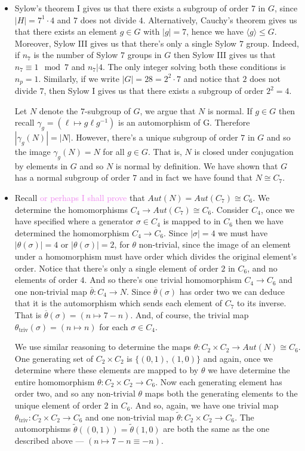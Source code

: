 \documentclass[12pt,letterpaper,boxed]{hmcpset}
\newcommand{\wg}[1]{\textcolor{violet}{#1}}
\newcommand{\abs}[1]{\left|#1\right|}
\newcommand{\inv}{^{-1}}
\begin{document}
\begin{solution}
\begin{itemize}
\item Sylow's theorem I gives us that there exists a subgroup of order
$7$ in $G$, since $\abs{H} = 7^1 \cdot 4$ and $7$ does not divide $4$. 
Alternatively, Cauchy's theorem gives us that there exists an element
$g \in G$ with $\abs{g} = 7$, hence we have $\langle g \rangle
\leq G$. Moreover, Sylow III gives us that there's only a single Sylow
$7$ group. Indeed, if $n_7$ is the number of Sylow $7$ groups in
$G$ then Sylow III gives us that $n_7 \equiv 1 \mod 7$ and $n_7 \vert
4$. The only integer solving both these conditions is $n_p = 1$. 
Similarly, if we write $\abs G = 28 = 2^2 \cdot 7$ and notice that $2$
does not divide $7$, then Sylow I gives us that there exists a subgroup of
order $2^2 = 4$.

Let $N$ denote the $7$-subgroup of $G$, we argue that $N$ is normal. 
If $g \in G$ then recall $\gamma_g =
(\ell \mapsto g\ell g\inv)$ is an automorphism of G. Therefore $\abs{\gamma_g(N)} =
\abs{N}$. However, there's a unique subgroup of order $7$ in $G$ and
so the image $\gamma_g(N) = N$ for all $g \in G$. That is, $N$ is
closed under conjugation by elements in $G$ and so $N$ is normal by
definition. We have shown that $G$ has a normal subgroup of order $7$
and in fact we have found that $N \cong C_7$.


\item Recall \wg{or perhaps I shall prove} that $Aut(N) = Aut(C_7)
\cong C_6$. We determine the homomorphisms $C_4 \to Aut(C_7) \cong
C_6$. 
Consider $C_4$, once we have specified where a generator
$\sigma \in C_4$ is mapped to in $C_6$ then we have determined the
homomorphism $C_4 \to C_6$.
Since $\abs \sigma = 4$ we must have $\abs{\theta(\sigma)} = 4$ or
$\abs{\theta(\sigma)} = 2$, for $\theta$ non-trivial,
since the image of an element under a homomorphism must have order
which divides the original element's order.
Notice that there's only a single element of order $2$ in $C_6$, and
no elements of order $4$. And
so there's one trivial homomorphism $C_4 \to C_6$ and one non-trivial map $\overline \theta: C_4
\to N$.
Since $\overline\theta(\sigma)$ has order two we can deduce that it is the
automorphism which sends each element of $C_7$ to its inverse. That is 
$\overline\theta(\sigma) = (n \mapsto 7 - n)$. And, of course, the
trivial map $\theta_{\text{triv}}(\sigma) = (n \mapsto n)$ for each
$\sigma \in C_4$. 

We use similar reasoning to determine the maps $\theta: C_2 \times C_2
\to Aut(N) \cong C_6$. One generating set of $C_2 \times C_2$ is
$\{(0,1), (1,0)\}$ and again, once we determine where these elements
are mapped to by $\theta$ we have determine the entire homomorphism
$\theta: C_2 \times C_2 \to C_6$. Now each generating element has
order two, and so any non-trivial $\theta$ maps both the generating
elements to the unique element of order $2$ in $C_6$. 
And so, again, we have one trivial map $\theta_{\text{triv}}: C_2
\times C_2 \to C_6$ and one non-trivial map $\tilde \theta: C_2 \times
C_2 \to C_6$. The automorphisms $\tilde \theta((0,1)) =
\tilde\theta(1,0)$ are both the same as the one described above ---
$(n \mapsto 7 - n \equiv -n)$.


\end{itemize}
\end{solution}
\end{document}
